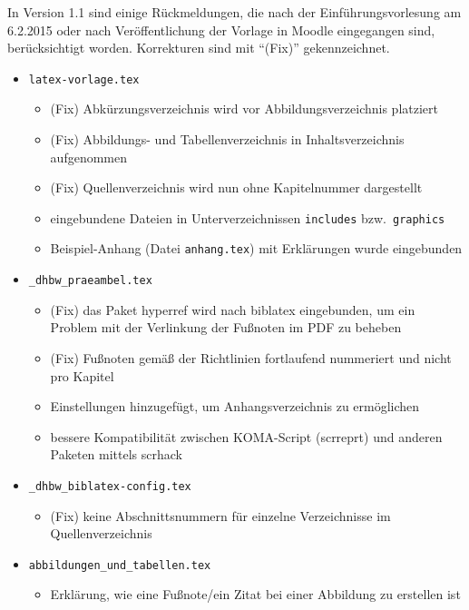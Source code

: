 \label{anhang:ReleaseNotes11}
In Version 1.1 sind einige Rückmeldungen, die nach der Einführungsvorlesung am 6.2.2015 oder nach Veröffentlichung der Vorlage in Moodle eingegangen sind, berücksichtigt worden. Korrekturen sind mit \enquote{(Fix)} gekennzeichnet. 

\begin{itemize}
\item \verb|latex-vorlage.tex|
\begin{itemize}
\item (Fix) Abkürzungsverzeichnis wird vor Abbildungsverzeichnis platziert
\item (Fix) Abbildungs- und Tabellenverzeichnis in Inhaltsverzeichnis aufgenommen
\item (Fix) Quellenverzeichnis wird nun ohne Kapitelnummer dargestellt

\item eingebundene Dateien in Unterverzeichnissen \verb|includes| bzw.\ \verb|graphics|
\item Beispiel-Anhang (Datei \verb|anhang.tex|) mit Erklärungen wurde eingebunden 
\end{itemize}

\item \verb|_dhbw_praeambel.tex|
\begin{itemize}
\item (Fix) das Paket hyperref wird nach biblatex eingebunden, um ein Problem mit der Verlinkung der Fußnoten im PDF zu beheben
\item (Fix) Fußnoten  gemäß der Richtlinien fortlaufend nummeriert und nicht pro Kapitel
\item Einstellungen hinzugefügt, um Anhangsverzeichnis zu ermöglichen
\item bessere Kompatibilität zwischen KOMA-Script (scrreprt) und anderen Paketen mittels scrhack
\end{itemize}

\item \verb|_dhbw_biblatex-config.tex|
\begin{itemize}
\item (Fix) keine Abschnittsnummern für einzelne Verzeichnisse im Quellenverzeichnis
\end{itemize}

\item \verb|abbildungen_und_tabellen.tex|
\begin{itemize}
\item Erklärung, wie eine Fußnote/ein Zitat bei einer Abbildung zu erstellen ist
\end{itemize}


\end{itemize}
